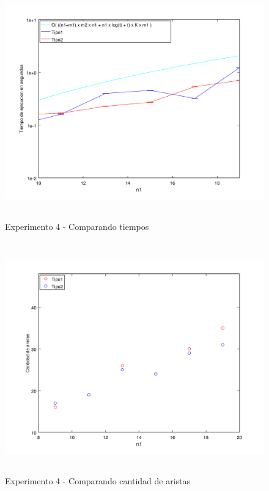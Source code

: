     \begin{figure}[H]
      \includegraphics[height=10cm]{graficos/ejercicio6-exp4-tiempos.png}
       \caption{Experimento 4 - Comparando tiempos}
	\end{figure}

 \begin{figure}[H]
      \includegraphics[height=10cm]{graficos/ejercicio6-exp4-aristas.png}
       \caption{Experimento 4 - Comparando cantidad de aristas}
	\end{figure}


